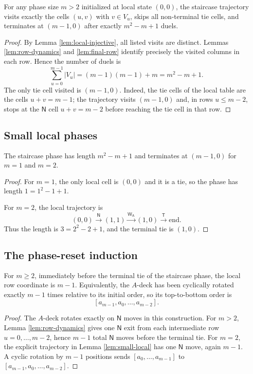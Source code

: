 \documentclass[12pt]{article}
\newcommand{\WA}{\mathsf{W_A}}
\newcommand{\TT}{\mathsf{T}}
\newcommand{\NN}{\mathsf{N}}
\begin{document}
\begin{theorem}\label{thm:local-staircase}
For any phase size $m>2$ initialized at local state $(0,0)$, the staircase trajectory visits exactly the cells $(u,v)$ with $v\in V_u$, skips all non-terminal tie cells, and terminates at $(m-1,0)$ after exactly $m^2-m+1$ duels.
\end{theorem}
\begin{proof}
By Lemma \ref{lem:local-injective}, all listed visits are distinct. Lemmas \ref{lem:row-dynamics} and \ref{lem:final-row} identify precisely the visited columns in each row. Hence the number of duels is
\[
\sum_{u=0}^{m-1}|V_u|=(m-1)(m-1)+m=m^2-m+1.
\]
The only tie cell visited is $(m-1,0)$. Indeed, the tie cells of the local table are the cells $u+v=m-1$; the trajectory visits $(m-1,0)$ and, in rows $u\le m-2$, stops at the $\NN$ cell $u+v=m-2$ before reaching the tie cell in that row.
\end{proof}

\subsection{Small local phases}
\begin{lemma}\label{lem:small-local}
The staircase phase has length $m^2-m+1$ and terminates at $(m-1,0)$ for $m=1$ and $m=2$.
\end{lemma}
\begin{proof}
For $m=1$, the only local cell is $(0,0)$ and it is a tie, so the phase has length $1=1^2-1+1$.

For $m=2$, the local trajectory is
\[
(0,0)\xrightarrow{\NN}(1,1)\xrightarrow{\WA}(1,0)\xrightarrow{\TT}\text{end}.
\]
Thus the length is $3=2^2-2+1$, and the terminal tie is $(1,0)$.
\end{proof}

\subsection{The phase-reset induction}
\begin{lemma}\label{lem:row-offset}
For $m\ge2$, immediately before the terminal tie of the staircase phase, the local row coordinate is $m-1$. Equivalently, the $A$-deck has been cyclically rotated exactly $m-1$ times relative to its initial order, so its top-to-bottom order is
\[
[a_{m-1},a_0,\dots,a_{m-2}].
\]
\end{lemma}
\begin{proof}
The $A$-deck rotates exactly on $\NN$ moves in this construction. For $m>2$, Lemma \ref{lem:row-dynamics} gives one $\NN$ exit from each intermediate row $u=0,\dots,m-2$, hence $m-1$ total $\NN$ moves before the terminal tie. For $m=2$, the explicit trajectory in Lemma \ref{lem:small-local} has one $\NN$ move, again $m-1$. A cyclic rotation by $m-1$ positions sends $[a_0,\dots,a_{m-1}]$ to $[a_{m-1},a_0,\dots,a_{m-2}]$.
\end{proof}
\end{document}
